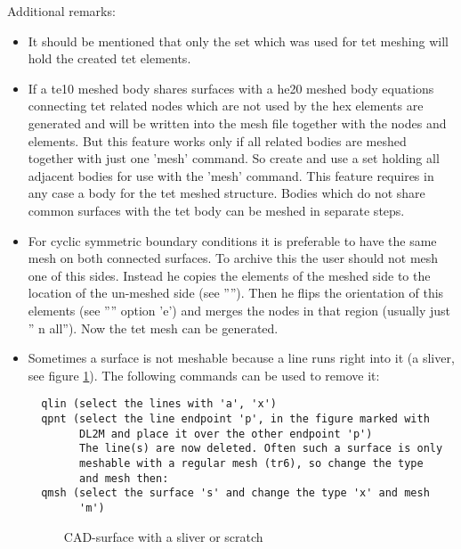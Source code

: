 \documentclass{article}
\begin{document}
\begin{appendix}
Additional remarks:
\begin{itemize}
\item It should be mentioned that only the set which was used for tet meshing will hold the created tet elements.
\item If a te10 meshed body shares surfaces with a he20 meshed body equations connecting tet related nodes which are not used by the hex elements are generated and will be written into the mesh file together with the nodes and elements. But this feature works only if all related bodies are meshed together with just one 'mesh' command. So create and use a set holding all adjacent bodies for use with the 'mesh' command. This feature requires in any case a body for the tet meshed structure. Bodies which do not share common surfaces with the tet body can be meshed in separate steps.
\item For cyclic symmetric boundary conditions it is preferable to have the same mesh on both connected surfaces. To archive this the user should not mesh one of this sides. Instead he copies the elements of the meshed side to the location of the un-meshed side (see ''''). Then he flips the orientation of this elements (see '''' option 'e') and merges the nodes in that region (usually just '' n all''). Now the tet mesh can be generated.
\item Sometimes a surface is not meshable because a line runs right into it (a sliver, see figure \ref{sliver}). The following commands can be used to remove it:
\begin{verbatim}
  qlin (select the lines with 'a', 'x')
  qpnt (select the line endpoint 'p', in the figure marked with
        DL2M and place it over the other endpoint 'p')
        The line(s) are now deleted. Often such a surface is only
        meshable with a regular mesh (tr6), so change the type
        and mesh then:
  qmsh (select the surface 's' and change the type 'x' and mesh
        'm')
\end{verbatim}

  \begin{figure}[h]
\caption{\label{sliver} CAD-surface with a sliver or scratch }
\end{figure}

\end{itemize}


\end{appendix}
\end{document}
